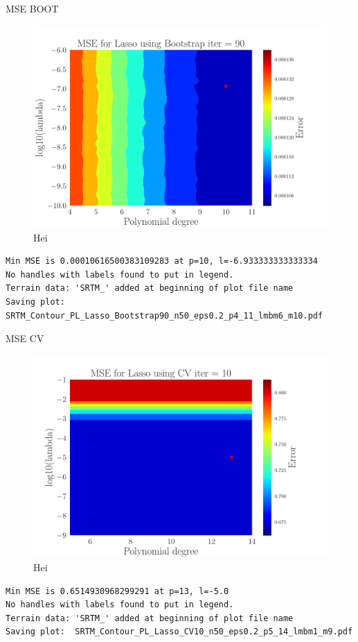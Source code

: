 \documentclass[reprint,english,notitlepage,aps,nobalancelastpage,nofootinbib]{revtex4-1}  %
\begin{document}
MSE BOOT
\begin{figure}[h]
	\includegraphics[width=\linewidth]{SRTM_Contour_PL_Lasso_Bootstrap90_n50_eps0.2_p4_11_lmbm6_m10.pdf}
	\caption{Hei}
	\label{fig:terrain_Lasso_MSE_Boot}
\end{figure}
\begin{verbatim}
Min MSE is 0.00010616500383109283 at p=10, l=-6.933333333333334
No handles with labels found to put in legend.
Terrain data: 'SRTM_' added at beginning of plot file name
Saving plot:  SRTM_Contour_PL_Lasso_Bootstrap90_n50_eps0.2_p4_11_lmbm6_m10.pdf
\end{verbatim}
MSE CV
\begin{figure}[h]
	\includegraphics[width=\linewidth]{SRTM_Contour_PL_Lasso_CV10_n50_eps0.2_p5_14_lmbm1_m9.pdf}
	\caption{Hei}
	\label{fig:terrain_Lasso_MSE_CV}
\end{figure}
\begin{verbatim}
Min MSE is 0.6514930968299291 at p=13, l=-5.0
No handles with labels found to put in legend.
Terrain data: 'SRTM_' added at beginning of plot file name
Saving plot:  SRTM_Contour_PL_Lasso_CV10_n50_eps0.2_p5_14_lmbm1_m9.pdf
\end{verbatim}
\end{document}
